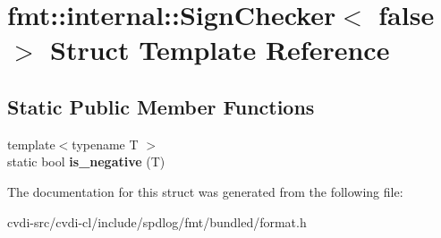 \hypertarget{structfmt_1_1internal_1_1SignChecker_3_01false_01_4}{}\section{fmt\+:\+:internal\+:\+:Sign\+Checker$<$ false $>$ Struct Template Reference}
\label{structfmt_1_1internal_1_1SignChecker_3_01false_01_4}
\subsection*{Static Public Member Functions}
\begin{DoxyCompactItemize}
\item 
{\footnotesize template$<$typename T $>$ }\\static bool {\bfseries is\+\_\+negative} (T)\hypertarget{structfmt_1_1internal_1_1SignChecker_3_01false_01_4_a3d5a1c205e3f44b829046f65b131a3d8}{}\label{structfmt_1_1internal_1_1SignChecker_3_01false_01_4_a3d5a1c205e3f44b829046f65b131a3d8}

\end{DoxyCompactItemize}


The documentation for this struct was generated from the following file\+:\begin{DoxyCompactItemize}
\item 
cvdi-\/src/cvdi-\/cl/include/spdlog/fmt/bundled/format.\+h\end{DoxyCompactItemize}
